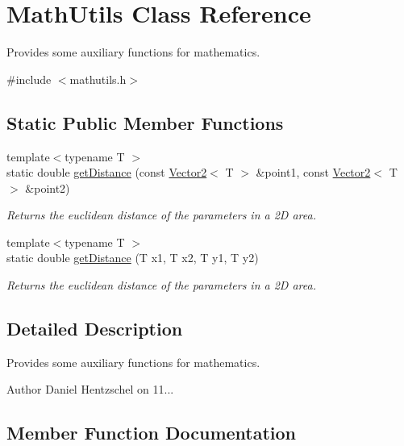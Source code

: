 \hypertarget{class_math_utils}{}\section{Math\+Utils Class Reference}
\label{class_math_utils}


Provides some auxiliary functions for mathematics.  




{\ttfamily \#include $<$mathutils.\+h$>$}

\subsection*{Static Public Member Functions}
\begin{DoxyCompactItemize}
\item 
{\footnotesize template$<$typename T $>$ }\\static double \mbox{\hyperlink{class_math_utils_a118906a726a3f01b06d2d4804fb02470}{get\+Distance}} (const \mbox{\hyperlink{class_vector2}{Vector2}}$<$ T $>$ \&point1, const \mbox{\hyperlink{class_vector2}{Vector2}}$<$ T $>$ \&point2)
\begin{DoxyCompactList}\small\item\em Returns the euclidean distance of the parameters in a 2D area. \end{DoxyCompactList}\item 
{\footnotesize template$<$typename T $>$ }\\static double \mbox{\hyperlink{class_math_utils_a97856a63da5b123560084391a4ad4b9f}{get\+Distance}} (T x1, T x2, T y1, T y2)
\begin{DoxyCompactList}\small\item\em Returns the euclidean distance of the parameters in a 2D area. \end{DoxyCompactList}\end{DoxyCompactItemize}


\subsection{Detailed Description}
Provides some auxiliary functions for mathematics. 

\begin{DoxyAuthor}{Author}
Daniel Hentzschel on 11... 
\end{DoxyAuthor}


\subsection{Member Function Documentation}
\mbox{\label{class_math_utils_a118906a726a3f01b06d2d4804fb02470}} 
